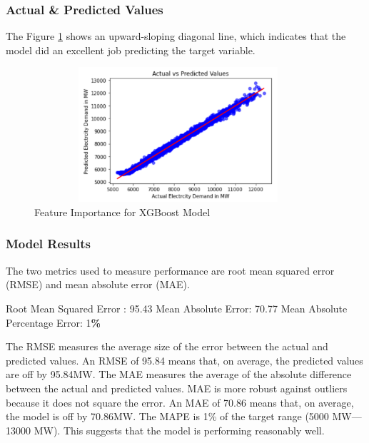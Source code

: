 \documentclass[mstat,12pt]{unswthesis}
\newenvironment{Shaded}{\begin{snugshade}}{\end{snugshade}}
\newcommand{\DecValTok}[1]{\textcolor[rgb]{0.00,0.00,0.81}{#1}}
\newcommand{\FloatTok}[1]{\textcolor[rgb]{0.00,0.00,0.81}{#1}}
\newcommand{\NormalTok}[1]{#1}
\newcommand{\OperatorTok}[1]{\textcolor[rgb]{0.81,0.36,0.00}{\textbf{#1}}}
\begin{document}
\subsubsection{Actual \& Predicted
Values}\label{actual-predicted-values}

The Figure \ref{actualpredict} shows an upward-sloping diagonal line,
which indicates that the model did an excellent job predicting the
target variable.

\begin{figure}[H]
\centering
\includegraphics[width=0.95\textwidth, height=5cm]{actualpredict.png}
\caption{Feature Importance for XGBoost Model}\label{actualpredict}
\end{figure}

\subsubsection{Model Results}\label{model-results}

The two metrics used to measure performance are root mean squared error
(RMSE) and mean absolute error (MAE).

\begin{Shaded}
\begin{Highlighting}[]
\NormalTok{Root Mean Squared Error : }\FloatTok{95.43}
\NormalTok{Mean Absolute Error: }\FloatTok{70.77}
\NormalTok{Mean Absolute Percentage Error: }\DecValTok{1}\OperatorTok{\%}
\end{Highlighting}
\end{Shaded}

The RMSE measures the average size of the error between the actual and
predicted values. An RMSE of 95.84 means that, on average, the predicted
values are off by 95.84MW. The MAE measures the average of the absolute
difference between the actual and predicted values. MAE is more robust
against outliers because it does not square the error. An MAE of 70.86
means that, on average, the model is off by 70.86MW. The MAPE is 1\% of
the target range (5000 MW---13000 MW). This suggests that the model is
performing reasonably well.
\end{document}
